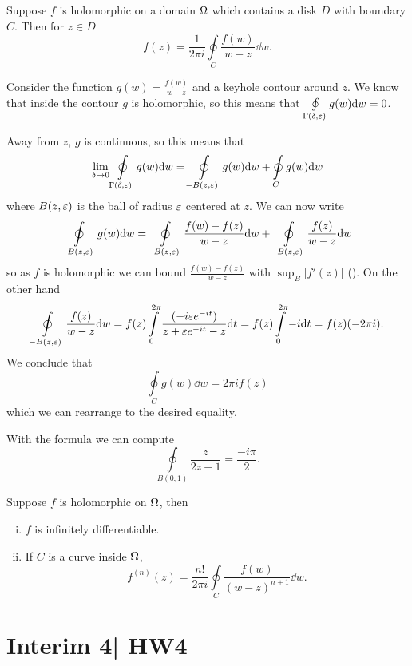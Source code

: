 \documentclass[12pt]{memoir}
\begin{document}
Suppose $f$ is holomorphic on a domain $\Omega$ which contains a disk $D$ with boundary $C$. Then for $z\in D$ 
$$f(z)=\frac{1}{2\pi i}\oint\limits_C\frac{f(w)}{w-z}\dd w.$$

\begin{ptcbp}
    Consider the function $g(w)=\frac{f(w)}{w-z}$ and a keyhole contour around $z$. We know that inside the contour $g$ is holomorphic, so this means that $\oint\limits_{\Gamma(\delta,\varepsilon)}g(w)\dd w=0$.\par 
    Away from $z$, $g$ is continuous, so this means that 
    $$\lim_{\delta\to 0}\oint\limits_{\Gamma(\delta,\varepsilon)}g(w)\dd w=\oint\limits_{-B(z,\varepsilon)}g(w)\dd w+\oint\limits_Cg(w)\dd w$$
    where $B(z,\varepsilon)$ is the ball of radius $\varepsilon$ centered at $z$. We can now write 
    $$\oint\limits_{-B(z,\varepsilon)}g(w)\dd w=\oint\limits_{-B(z,\varepsilon)}\frac{f(w)-f(z)}{w-z}\dd w+\oint\limits_{-B(z,\varepsilon)}\frac{f(z)}{w-z}\dd w$$
    so as $f$ is holomorphic we can bound $\frac{f(w)-f(z)}{w-z}$ with $\sup_{B}|f'(z)|$ (). On the other hand 
    $$\oint\limits_{-B(z,\varepsilon)}\frac{f(z)}{w-z}\dd w=f(z)\int\limits_{0}^{2\pi}\frac{(-i\varepsilon e^{-it})}{z+\varepsilon e^{-it}-z}\dd t=f(z)\int\limits_{0}^{2\pi}-i\dd t=f(z)(-2\pi i).$$
    We conclude that 
    $$\oint\limits_Cg(w)\dd w=2\pi i f(z)$$
    which we can rearrange to the desired equality.
\end{ptcbp}

\begin{Ex}
    With the formula we can compute 
    $$\oint\limits_{B(0,1)}\frac{z}{2z+1}=\frac{-i\pi}{2}.$$
\end{Ex}

\begin{Th}
    Suppose $f$ is holomorphic on $\Omega$, then 
    \begin{enumerate}[i)]
        \itemsep=-0.4em
        \item $f$ is infinitely differentiable.
        \item If $C$ is a curve inside $\Omega$, 
        $$f^{(n)}(z)=\frac{n!}{2\pi i}\oint\limits_C\frac{f(w)}{(w-z)^{n+1}}\dd w.$$
    \end{enumerate}
\end{Th}

\section{Interim 4| HW4}
\end{document}
